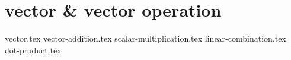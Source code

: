 \chapter{vector \& vector operation}
{vector.tex}
{vector-addition.tex}
{scalar-multiplication.tex}
{linear-combination.tex}
{dot-product.tex}